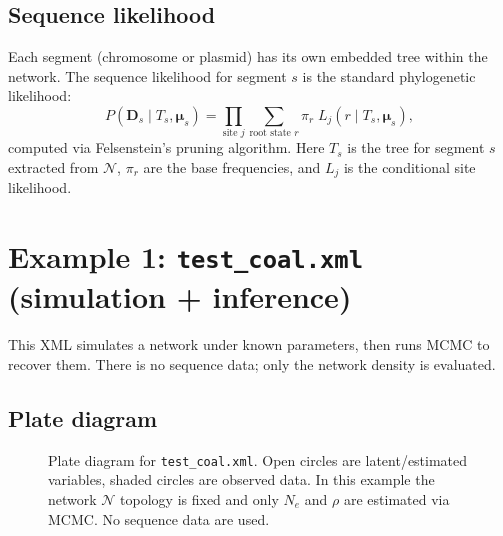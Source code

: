 \documentclass[11pt]{article}
\begin{document}
\subsection{Sequence likelihood}

Each segment (chromosome or plasmid) has its own embedded tree within the network. The sequence likelihood for segment $s$ is the standard phylogenetic likelihood:
\begin{equation}
  P(\mathbf{D}_s \mid T_s, \boldsymbol{\mu}_s) = \prod_{\text{site } j} \sum_{\text{root state } r} \pi_r \; L_j(r \mid T_s, \boldsymbol{\mu}_s),
\end{equation}
computed via Felsenstein's pruning algorithm. Here $T_s$ is the tree for segment $s$ extracted from $\mathcal{N}$, $\pi_r$ are the base frequencies, and $L_j$ is the conditional site likelihood.

\section{Example 1: \texttt{test\_coal.xml} (simulation + inference)}

This XML simulates a network under known parameters, then runs MCMC to recover them. There is no sequence data; only the network density is evaluated.

\subsection{Plate diagram}

\begin{figure}[H]
\centering
{}
\caption{Plate diagram for \texttt{test\_coal.xml}. Open circles are latent/estimated variables, shaded circles are observed data. In this example the network $\mathcal{N}$ topology is fixed and only $N_e$ and $\rho$ are estimated via MCMC. No sequence data are used.}
\label{fig:plate-test}
\end{figure}
\end{document}
